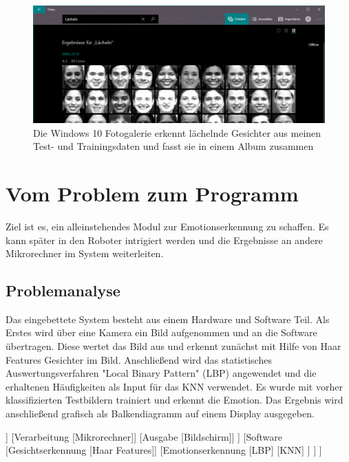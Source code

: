 \documentclass[12pt, a4paper]{article}
\begin{document}
\begin{figure}
	\includegraphics[width=\textwidth]{windows_fotos_laecheln_all_faces_top}
	\caption{Die Windows 10 Fotogalerie erkennt lächelnde Gesichter aus meinen Test- und Trainingsdaten und fasst sie in einem Album zusammen}
\end{figure}

\section{Vom Problem zum Programm}
Ziel ist es, ein alleinstehendes  Modul zur Emotionserkennung zu schaffen. Es kann später in den Roboter intrigiert werden und die Ergebnisse an andere Mikrorechner im System weiterleiten.

\subsection{Problemanalyse}

Das eingebettete System besteht aus einem Hardware und Software Teil. Als Erstes wird über eine Kamera ein Bild aufgenommen und an die Software übertragen. Diese wertet das Bild aus und erkennt zunächst mit Hilfe von Haar Features Gesichter im Bild. Anschließend wird das statistisches Auswertungsverfahren "Local Binary Pattern" (LBP) angewendet und die erhaltenen Häufigkeiten als Input für das KNN verwendet. Es wurde mit vorher klassifizierten Testbildern trainiert und erkennt die Emotion. Das Ergebnis wird anschließend grafisch als Balkendiagramm auf einem Display ausgegeben.

\bigskip
\begin{forest}
[{Eingebettetes System} 
	[Hardware
		[Eingabe [Kamera]] 
		[Verarbeitung [Mikrorechner]] 
		[Ausgabe [Bildschirm]] 
	] 
	[Software 
		[Gesichtserkennung [Haar Features]]
		[Emotionserkennung
			[LBP]
			[KNN]
		]
	]
]
\end{forest}
\end{document}
